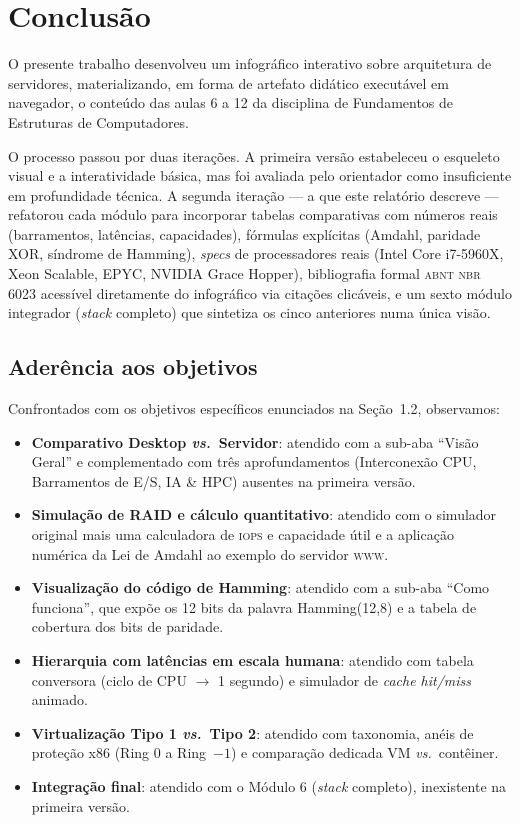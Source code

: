 \chapter{Conclusão}
\label{cap:conclusao}

O presente trabalho desenvolveu um infográfico interativo sobre
arquitetura de servidores, materializando, em forma de artefato
didático executável em navegador, o conteúdo das aulas 6 a 12 da
disciplina de Fundamentos de Estruturas de Computadores.

O processo passou por duas iterações. A primeira versão estabeleceu
o esqueleto visual e a interatividade básica, mas foi avaliada pelo
orientador como insuficiente em profundidade técnica. A segunda
iteração --- a que este relatório descreve --- refatorou cada
módulo para incorporar tabelas comparativas com números reais
(barramentos, latências, capacidades), fórmulas explícitas (Amdahl,
paridade XOR, síndrome de Hamming), \emph{specs} de processadores
reais (Intel Core i7-5960X, Xeon Scalable, EPYC, NVIDIA Grace
Hopper), bibliografia formal \textsc{abnt} \textsc{nbr 6023}
acessível diretamente do infográfico via citações clicáveis, e um
sexto módulo integrador (\emph{stack} completo) que sintetiza os
cinco anteriores numa única visão.

\section{Aderência aos objetivos}

Confrontados com os objetivos específicos enunciados na
Seção~1.2, observamos:

\begin{itemize}
    \item \textbf{Comparativo Desktop \textit{vs.}\ Servidor}: atendido
          com a sub-aba ``Visão Geral'' e complementado com três
          aprofundamentos (Interconexão CPU, Barramentos de E/S,
          IA \& HPC) ausentes na primeira versão.
    \item \textbf{Simulação de RAID e cálculo quantitativo}: atendido
          com o simulador original mais uma calculadora de \textsc{iops}
          e capacidade útil e a aplicação numérica da Lei de Amdahl
          ao exemplo do servidor \textsc{www}.
    \item \textbf{Visualização do código de Hamming}: atendido com a
          sub-aba ``Como funciona'', que expõe os 12 bits da palavra
          Hamming(12,8) e a tabela de cobertura dos bits de paridade.
    \item \textbf{Hierarquia com latências em escala humana}: atendido
          com tabela conversora (ciclo de CPU $\to$ 1 segundo) e
          simulador de \textit{cache hit/miss} animado.
    \item \textbf{Virtualização Tipo 1 \textit{vs.}\ Tipo 2}:
          atendido com taxonomia, anéis de proteção x86 (Ring 0 a
          Ring~$-1$) e comparação dedicada VM \textit{vs.}\ contêiner.
    \item \textbf{Integração final}: atendido com o Módulo 6
          (\emph{stack} completo), inexistente na primeira versão.
\end{itemize}

